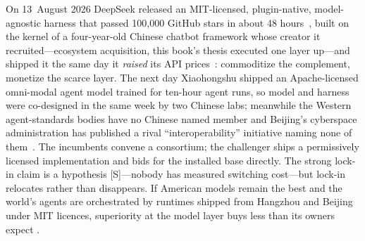 On 13~August 2026 DeepSeek released an MIT-licensed, plugin-native, model-agnostic harness that passed 100,000 GitHub stars in about 48 hours~\cite{dsh-repo,dsh-official}, built on the kernel of a four-year-old Chinese chatbot framework whose creator it recruited---ecosystem acquisition, this book's thesis executed one layer up---and shipped it the same day it \emph{raised} its API prices~\cite{deepseek-v4pro}: commoditize the complement, monetize the scarce layer. The next day Xiaohongshu shipped an Apache-licensed omni-modal agent model trained for ten-hour agent runs, so model and harness were co-designed in the same week by two Chinese labs; meanwhile the Western agent-standards bodies have no Chinese named member and Beijing's cyberspace administration has published a rival ``interoperability'' initiative naming none of them~\cite{cac-agents}. The incumbents convene a consortium; the challenger ships a permissively licensed implementation and bids for the installed base directly. The strong lock-in claim is a hypothesis [S]---nobody has measured switching cost---but lock-in relocates rather than disappears. If American models remain the best and the world's agents are orchestrated by runtimes shipped from Hangzhou and Beijing under MIT licences, superiority at the model layer buys less than its owners expect .

